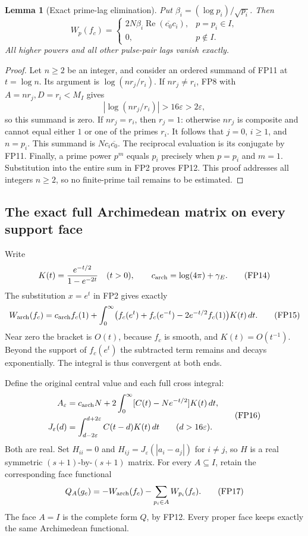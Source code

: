 \documentclass[11pt,a4paper]{article}
\newtheorem{lemma}[theorem]{Lemma}
\theoremstyle{definition}\newtheorem{definition}[theorem]{Definition}
\begin{document}
\begin{lemma}[Exact prime-lag elimination]\label{fp:lem:prime}
Put \(\beta_i=(\log p_i)/\sqrt{p_i}\). Then
\[
 W_p(f_c)=
 \begin{cases}
 2N\beta_i\operatorname{Re}(\overline{c_0}c_i),&p=p_i\in I,\\
 0,&p\notin I .
 \end{cases}
 \tag{FP12}\label{fp:fpb:prime}
\]
All higher powers and all other pulse-pair lags vanish exactly.
\end{lemma}
\begin{proof}
Let \(n\ge2\) be an integer, and consider an ordered summand of
FP11 at \(t=\log n\). Its argument is
\(\log(nr_j/r_i)\). If \(nr_j\ne r_i\), FP8 with
\(A=nr_j,D=r_i<M_I\) gives
\[
 |\log(nr_j/r_i)|>16\varepsilon>2\varepsilon,
 \tag{FP13}
\]
so this summand is zero. If \(nr_j=r_i\), then \(r_j=1\):
otherwise \(nr_j\) is composite and cannot equal either \(1\) or
one of the primes \(r_i\). It follows that \(j=0\), \(i\ge1\),
and \(n=p_i\). This summand is \(Nc_i\overline{c_0}\).
The reciprocal evaluation is its conjugate by FP11.
Finally, a prime power \(p^m\) equals \(p_i\) precisely when
\(p=p_i\) and \(m=1\). Substitution into the entire sum in FP2
proves FP12. This proof addresses all integers \(n\ge2\), so no
finite-prime tail remains to be estimated.
\end{proof}

\subsection{The exact full Archimedean matrix on every support face}

Write
\[
 K(t)=\frac{e^{-t/2}}{1-e^{-2t}}\quad(t>0),
 \qquad c_{\rm arch}=\log(4\pi)+\gamma_E .
 \tag{FP14}
\]
The substitution \(x=e^t\) in FP2 gives exactly
\[
 W_{\rm arch}(f_c)=c_{\rm arch}f_c(1)
  +\int_0^\infty
    \bigl(f_c(e^t)+f_c(e^{-t})-2e^{-t/2}f_c(1)\bigr)K(t)\,dt .
 \tag{FP15}\label{fp:fpb:arch}
\]
Near zero the bracket is \(O(t)\), because \(f_c\) is smooth,
and \(K(t)=O(t^{-1})\). Beyond the support of \(f_c(e^t)\)
the subtracted term remains and decays exponentially.
The integral is thus convergent at both ends.

Define the original central value and each full cross integral:
\[
 \begin{aligned}
 A_\varepsilon&=c_{\rm arch}N+
              2\int_0^\infty[C(t)-Ne^{-t/2}]K(t)\,dt,\\
 J_\varepsilon(d)&=\int_{d-2\varepsilon}^{d+2\varepsilon}C(t-d)K(t)\,dt
                       \qquad(d>16\varepsilon).
 \end{aligned}
 \tag{FP16}\label{fp:fpb:AJ}
\]
Both are real. Set \(H_{ii}=0\) and
\(H_{ij}=J_\varepsilon(|a_i-a_j|)\) for \(i\ne j\), so \(H\) is a
real symmetric \((s+1)\)-by-\((s+1)\) matrix.
For every \(A\subseteq I\), retain the corresponding face functional
\[
 Q_A(g_c)=-W_{\rm arch}(f_c)-\sum_{p_i\in A}W_{p_i}(f_c).
 \tag{FP17}
\]
The face \(A=I\) is the complete form \(Q\), by FP12.
Every proper face keeps exactly the same Archimedean functional.
\end{document}
